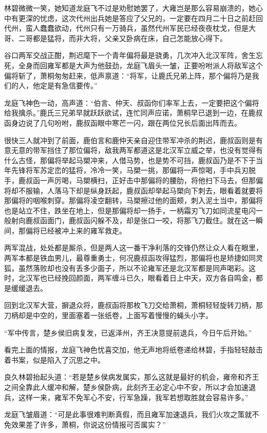 林碧微微一笑，她知道龙庭飞不过是劝慰她罢了，大雍岂是那么容易崩溃的，她心中有更深的忧虑，这次代州出兵她是答应了父兄的，一定要在四月二十日之前赶回代州，蛮人蠢蠢欲动，代州只有一万骑兵，虽然代州军民已经夜夜枕戈，但是大哥、二哥都是猛将，而非大将，父亲又卧病在床，自己怎能放心得下。

谷口两军交战正酣，荆迟麾下一个青年偏将最是骁勇，几次冲入北汉军阵，舍生忘死，全身而回雍军都是大声为他鼓劲，龙庭飞眉头一皱，正要吩咐派人将敌军这个偏将斩了，萧桐匆匆赶来，低声禀道：“将军，让鹿氏兄弟上阵，那个偏将乃是我们的人，他定是有急信要传。”

龙庭飞神色一动，高声道：“伯言、仲天、叔函你们率军上去，一定要把这个偏将给我擒杀。”鹿氏三兄弟早就跃跃欲试，连忙同声应诺，萧桐早已退到一边，在鹿叔函身边说了几句吩咐，鹿叔函眼中寒芒一闪，跟在两位兄长后面出阵而去。

很快三人就冲到了前面，鹿伯言和鹿仲天亲自迎住带军冲杀的荆迟，鹿叔函则是有意无意的带军挡住了那位偏将，敌我两军都道这是北汉军立威之举，也没有觉得有什么古怪，那偏将举起马槊冲来，人借马势，也是势不可挡，鹿叔函乃是不下于当年先锋将军苏定峦的猛将，冷冷一笑，马槊一挑，那偏将一声惊喝，手中兵刃脱手，鹿叔函一声厉喝，马槊横扫，正好击中那偏将的腰肋，将他扫下马去，但那偏将却不服输，人落马下却是纵身跃起，鹿叔函却举起马槊向下刺去，眼看着就要将那偏将的咽喉刺穿。那偏将凌空翻转，马槊擦过他的面颊，刺入泥土当中，那偏将也是站立不住，跌坐在地上，但是那偏将却一扬手，一柄霜刃飞刀如同流星电闪一般射向鹿叔函面门，鹿叔函闪躲不及，却是张口一咬，将那飞刀截住。就在这一瞬间，那偏将已经被冲上来的雍军救走。

两军混战，处处都是厮杀，但是两人这一番干净利落的交锋仍然让众人看在眼里，两军本都是铁血男儿，最尊重勇士，何况鹿叔函攻得猛烈，那偏将也是矫捷如同灵狐，虽然落败却也没有丢多少面子，所以不论雍军还是北汉军都是同声喝彩。这时，北汉军也已经挽回颜面，两军缠斗已久，眼看着日上中天，双方各自鸣金，都是缓缓退去。

回到北汉军大营，摒退众将，鹿叔函将那枚飞刀交给萧桐，萧桐轻轻旋转刀柄，那刀柄却是中空的，里面塞着一张纸卷，上面写着慢慢的蝇头小字。

“军中传言，楚乡侯旧病复发，已返泽州，齐王决意提前退兵，今日午后开始。”

看完上面的情报，龙庭飞神色忧喜交加，他无声地将纸卷递给林碧，手指轻轻敲击着书案，似是陷入了沉思之中。

良久林碧抬起头道：“若是楚乡侯病发属实，那么这就是最好的机会，雍帝和齐王之间全靠此人缓冲和解，楚乡侯卧病，此刻齐王必定心中不安，所以才会加速退兵，这样一来，雍军不免军心不安，行军急躁，我军若想取胜就会容易许多。”

龙庭飞皱眉道：“可是此事很难判断真假，而且雍军加速退兵，我们火攻之策就不免效果差了许多，萧桐，你说这份情报可否属实？”

